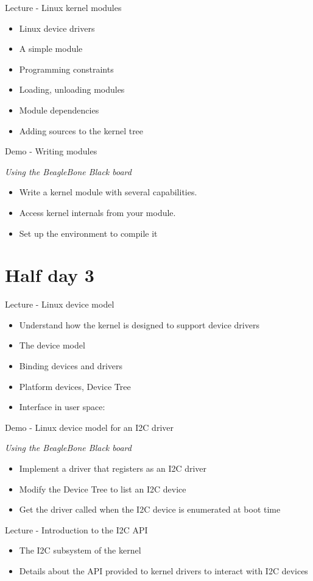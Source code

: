 \documentclass[a4paper,12pt,obeyspaces,spaces,hyphens]{article}
\begin{document}
\feagendatwocolumn
{Lecture - Linux kernel modules}
{
  \begin{itemize}
  \item Linux device drivers
  \item A simple module
  \item Programming constraints
  \item Loading, unloading modules
  \item Module dependencies
  \item Adding sources to the kernel tree
  \end{itemize}
}
{Demo - Writing modules}
{
  {\em Using the BeagleBone Black board}
  \begin{itemize}
  \item Write a kernel module with several capabilities.
  \item Access kernel internals from your module.
  \item Set up the environment to compile it
  \end{itemize}
}

\section{Half day 3}

\feagendatwocolumn
{Lecture - Linux device model}
{
  \begin{itemize}
  \item Understand how the kernel is designed to support device
    drivers
  \item The device model
  \item Binding devices and drivers
  \item Platform devices, Device Tree
  \item Interface in user space: 
  \end{itemize}
}
{Demo - Linux device model for an I2C driver}
{
  {\em Using the BeagleBone Black board}
  \begin{itemize}
  \item Implement a driver that registers as an I2C driver
  \item Modify the Device Tree to list an I2C device
  \item Get the driver called when the I2C device is enumerated at
    boot time
  \end{itemize}
}

\feagendaonecolumn
{Lecture - Introduction to the I2C API}
{
  \begin{itemize}
  \item The I2C subsystem of the kernel
  \item Details about the API provided to kernel drivers to interact
    with I2C devices
  \end{itemize}
}
\end{document}
